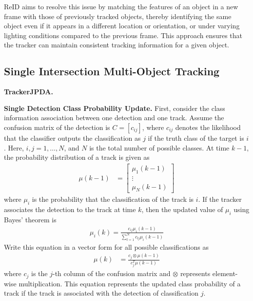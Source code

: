\documentclass[lettersize,journal]{IEEEtran}
\begin{document}
ReID aims to resolve this issue by matching the features of an object in a new frame with those of previously tracked objects, thereby identifying the same object even if it appears in a different location or orientation, or under varying lighting conditions compared to the previous frame. 
This approach ensures that the tracker can maintain consistent tracking information for a given object\cite{Alpher24d}.


\subsection{Single Intersection Multi-Object Tracking}

\textbf{TrackerJPDA.}

\textbf{Single Detection Class Probability Update.}
First, consider the class information association between one detection and one track. 
Assume the confusion matrix of the detection is $C=\left[c_{i j}\right]$, where $c_{i j}$ denotes the likelihood that the classifier outputs the classification as $j$ if the truth class of the target is $i$.
Here, $i,j = 1,…, N$, and $N$ is the total number of possible classes.
At time $k-1$, the probability distribution of a track is given as 
\begin{align}
	\mu(k-1) & = \left[\begin{array}{l}
		\mu_{1}(k-1) \\
		\vdots \\
		\mu_{N}(k-1)
	\end{array}\right]
\end{align}
where $\mu_{i}$ is the probability that the classification of the track is $i$.
If the tracker associates the detection to the track at time $k$, then the updated value of $\mu_{i}$ using Bayes' theorem is
\begin{align}
	\mu_{i}(k) = \frac{c_{i j} \mu_{i}(k-1)}{\sum_{l = 1}^{N} c_{l j} \mu_{i}(k-1)}
\end{align}
Write this equation in a vector form for all possible classifications as
\begin{align}
	\mu(k) & = \frac{c_{j} \otimes \mu(k-1)}{c_{j}^{T} \mu(k-1)}
\end{align}
where $c_{j}$ is the $j$-th column of the confusion matrix and $\otimes$ represents element-wise multiplication. 
This equation represents the updated class probability of a track if the track is associated with the detection of classification $j$.
\end{document}
